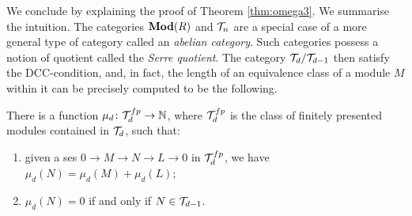 \documentclass[runningheads]{llncs}
\begin{document}
We conclude by explaining the proof of Theorem \ref{thm:omega3}. We summarise the intuition.
The categories $\operatorname{\mathbf{Mod}}(R)$ and $\mathcal T_n$ are a special case of a more general type of category called an \emph{abelian category}. 
Such categories possess a notion of quotient called the \emph{Serre quotient}. 
The category $\mathcal T_d / \mathcal T_{d-1}$  then satisfy the DCC-condition, and, in fact, the length of an equivalence class of a module $M$ within it can be precisely computed to be the following.
\begin{propositionE}
\label{lem:mu}
There is a function $\mu_d \colon \mathcal T^{fp}_d \to \mathbb N$, where $\mathcal T^{fp}_d$ is the class of finitely presented modules contained in $\mathcal T_d$,  such that:
\begin{enumerate}
\item given a ses  $0\to M\to N \to L \to 0$ in $\mathcal T_d^{fp}$, we have $\mu_d(N) = \mu_d(M)+ \mu_d(L)$;
\item $\mu_d(N) = 0$ if and only if $N \in \mathcal T_{d-1}$.
\end{enumerate}
\end{propositionE}
\end{document}

